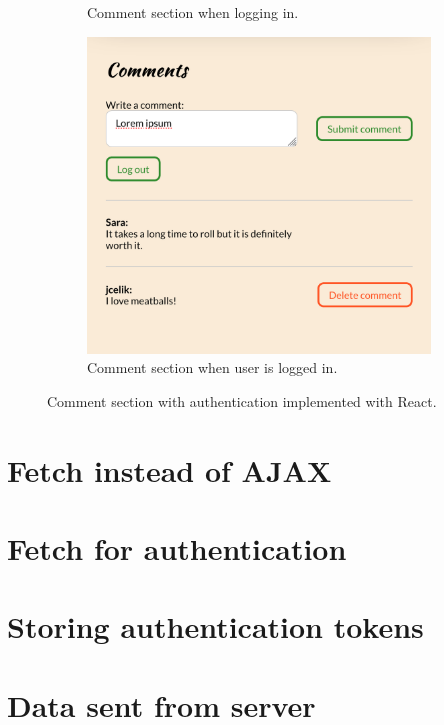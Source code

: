 \documentclass[a4paper]{scrartcl}
\begin{document}
\begin{figure}
\begin{subfigure}[b]{0.3\linewidth}
		\caption{Comment section when logging in.}
	\end{subfigure}
	\begin{subfigure}[b]{0.3\linewidth}
		\includegraphics[width=\linewidth]{images/screenshot-comments-logged_in.png}
		\caption{Comment section when user is logged in.}
	\end{subfigure}
	\caption{Comment section with authentication implemented with React.}
	\label{fig:comment-section}
\end{figure}

\section{Fetch instead of AJAX}

\section{Fetch for authentication}

\section{Storing authentication tokens}

\section{Data sent from server}
\end{document}
